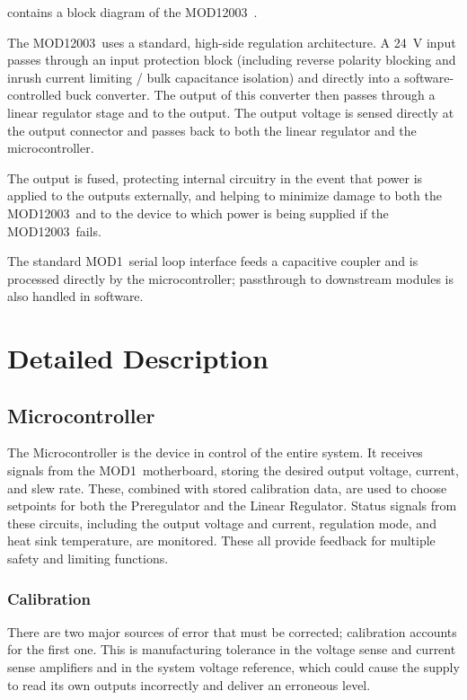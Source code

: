 \documentclass[letterpaper,twocolumn,10pt,openany,oneside,final,fleqn]{memoir}
\newcommand{\Model}{MOD12003\ }
\newcommand{\Series}{MOD1\ }
\begin{document}
 contains a block diagram of the \Model.

The \Model uses a standard, high-side regulation architecture. A \SI{24}{V} input
passes through an input protection block (including reverse polarity blocking and
inrush current limiting / bulk capacitance isolation) and directly into a software-controlled
buck converter. The output of this converter then passes through a linear regulator
stage and to the output. The output voltage is sensed directly at the output connector
and passes back to both the linear regulator and the microcontroller.

The output is fused, protecting internal circuitry in the event that power
is applied to the outputs externally, and helping to minimize damage to both the
\Model and to the device to which power is being supplied if the \Model fails.

The standard \Series serial loop interface feeds a capacitive coupler and is
processed directly by the microcontroller; passthrough to downstream modules is
also handled in software.

\section{Detailed Description}

\subsection{Microcontroller}

The Microcontroller is the device in control of the entire system. It receives signals
from the \Series motherboard, storing the desired output voltage, current, and slew rate.
These, combined with stored calibration data, are used to choose setpoints for both the
Preregulator and the Linear Regulator. Status signals from these circuits, including
the output voltage and current, regulation mode, and heat sink temperature, are monitored.
These all provide feedback for multiple safety and limiting functions.

\subsubsection{Calibration}

There are two major sources of error that must be corrected; calibration accounts for the
first one. This is manufacturing tolerance in the voltage sense and current sense amplifiers
and in the system voltage reference, which could cause the supply to read its own outputs
incorrectly and deliver an erroneous level.
\end{document}
